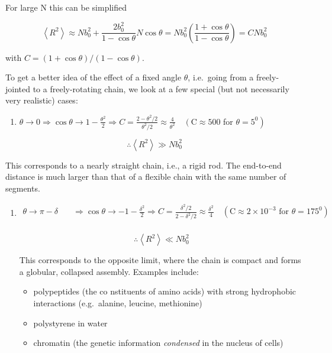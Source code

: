 \documentclass[
  letterpaper,
  enabledeprecatedfontcommands]{report}
\providecommand{\tightlist}{%
  \setlength{\itemsep}{0pt}\setlength{\parskip}{0pt}}
\begin{document}
For large N this can be simplified

\[\left\langle R^{2}\right\rangle \approx N b_{0}^{2}+\frac{2 b_{0}^{2}}{1-\cos \theta} N \cos \theta=N b_{0}^{2}\left(\frac{1+\cos \theta}{1-\cos \theta}\right)=C N b_{0}^{2}\]

with \(C=(1+\cos \theta) /(1-\cos \theta)\).

To get a better idea of the effect of a fixed angle \(\theta\),
i.e.~going from a freely-jointed to a freely-rotating chain, we look at
a few special (but not necessarily very realistic) cases:

\begin{enumerate}
\def\labelenumi{\arabic{enumi}.}
\tightlist
\item
  \(\theta \rightarrow 0 \Rightarrow \cos \theta \rightarrow 1-\frac{\theta^{2}}{2} \Rightarrow C=\frac{2-\theta^{2} / 2}{\theta^{2} / 2} \approx \frac{4}{\theta^{2}} \quad\left(\mathrm{C} \approx 500\right.\)
  for \(\left.\theta=5^{0}\right)\)
\end{enumerate}

\[
\therefore\left\langle R^{2}\right\rangle \gg N b_{0}^{2}
\]

This corresponds to a nearly straight chain, i.e., a rigid rod. The
end-to-end distance is much larger than that of a flexible chain with
the same number of segments.

\begin{enumerate}
\def\labelenumi{\arabic{enumi}.}
\setcounter{enumi}{1}
\item
  \[
  \begin{aligned}
  \theta \rightarrow \pi-\delta \quad & \Rightarrow \cos \theta \rightarrow-1-\frac{\delta^{2}}{2} \Rightarrow C=\frac{\delta^{2} / 2}{2-\delta^{2} / 2} \approx \frac{\delta^{2}}{4} \quad\left(\mathrm{C} \approx 2 \times 10^{-3} \text { for } \theta=175^{0}\right) \\
  \end{aligned}
  \]

  \[\therefore\left\langle R^{2}\right\rangle \ll N b_{0}^{2}\]

  This corresponds to the opposite limit, where the chain is compact and
  forms a globular, collapsed assembly. Examples include:

  \begin{itemize}
  \tightlist
  \item
    polypeptides (the co nstituents of amino acids) with strong
    hydrophobic interactions (e.g.~alanine, leucine, methionine)
  \item
    polystyrene in water
  \item
    chromatin (the genetic information \emph{condensed} in the nucleus
    of cells)
  \end{itemize}
\end{enumerate}
\end{document}

